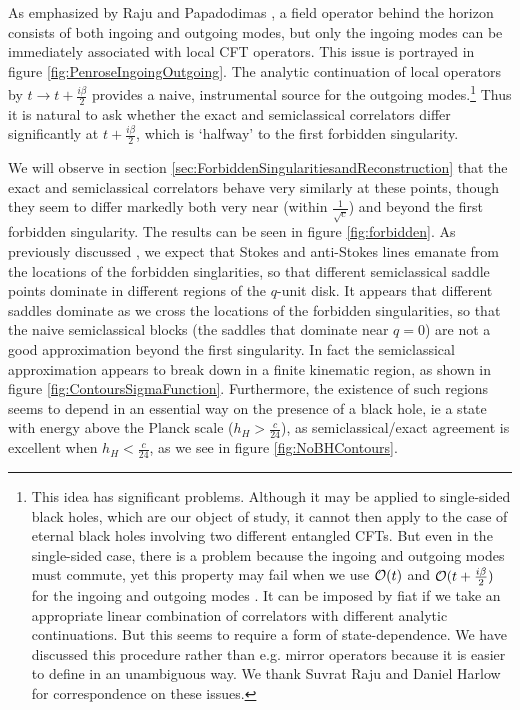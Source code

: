 As emphasized by Raju and Papadodimas \cite{Papadodimas:2012aq, Papadodimas:2013jku}, a field operator behind the horizon consists of both ingoing and outgoing modes, but only the ingoing modes can be immediately associated with local CFT operators.  This issue is portrayed in figure \ref{fig:PenroseIngoingOutgoing}.  The analytic continuation of local operators by $t \to t + \frac{i \beta}{2}$ provides a naive, instrumental source for the outgoing modes.\footnote{This idea has significant problems.  Although it may be applied to single-sided black holes, which are our object of study, it cannot then apply to the case of eternal black holes involving two different entangled CFTs.  But even in the single-sided case, there is a problem because the ingoing and outgoing modes must commute, yet this property may fail when we use ${\cal O}(t)$ and ${\cal O}(t + \frac{i \beta}{2})$ for the ingoing and outgoing modes \cite{Papadodimas:2012aq, Almheiri:2013hfa}.  It can be imposed by fiat if we take an appropriate linear combination of correlators with different analytic continuations. But this seems to require a form of state-dependence.  We have discussed this procedure rather than e.g. mirror operators \cite{Papadodimas:2012aq, Papadodimas:2013jku} because it is easier to define in an unambiguous way.  We thank Suvrat Raju and Daniel Harlow for correspondence on these issues.}  Thus it is natural to ask whether the exact and semiclassical correlators differ significantly at $t + \frac{i \beta}{2}$, which is `halfway' to the first forbidden singularity.  

We will observe in section \ref{sec:ForbiddenSingularitiesandReconstruction} that the exact and semiclassical correlators behave very similarly at these points, though they seem to differ markedly both very near (within $\frac{1}{\sqrt{c}}$) and beyond the first forbidden singularity.  The results can be seen in figure \ref{fig:forbidden}.  As previously discussed \cite{Fitzpatrick:2016ive}, we expect that Stokes and anti-Stokes lines emanate from the locations of the forbidden singlarities, so that different semiclassical saddle points dominate in different regions of the $q$-unit disk.  
It appears that different saddles dominate as we cross the locations of the forbidden singularities, so that the naive semiclassical blocks (the saddles that dominate near $q = 0$) are not a good approximation beyond the first singularity.  In fact the semiclassical approximation appears to break down in a finite kinematic region, as shown in figure \ref{fig:ContoursSigmaFunction}.  Furthermore, the existence of such regions seems to depend in an essential way on the presence of a black hole, ie a state with energy above the Planck scale ($h_H > \frac{c}{24}$), as semiclassical/exact agreement is excellent when $h_H < \frac{c}{24}$, as we see in figure \ref{fig:NoBHContours}.


